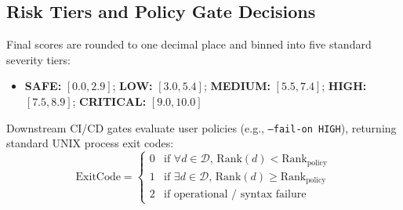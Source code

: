 \subsection{Risk Tiers and Policy Gate Decisions}
Final scores are rounded to one decimal place and binned into five standard severity tiers:
\begin{itemize}
    \item \textbf{SAFE:} $[0.0, 2.9]$; \textbf{LOW:} $[3.0, 5.4]$; \textbf{MEDIUM:} $[5.5, 7.4]$; \textbf{HIGH:} $[7.5, 8.9]$; \textbf{CRITICAL:} $[9.0, 10.0]$
\end{itemize}
Downstream CI/CD gates evaluate user policies (e.g., \texttt{--fail-on HIGH}), returning standard UNIX process exit codes:
\begin{equation}
\text{ExitCode} = \begin{cases}
0 & \text{if } \forall d \in \mathcal{D}, \, \text{Rank}(d) < \text{Rank}_{\text{policy}} \\
1 & \text{if } \exists d \in \mathcal{D}, \, \text{Rank}(d) \ge \text{Rank}_{\text{policy}} \\
2 & \text{if operational / syntax failure}
\end{cases}
\end{equation}
